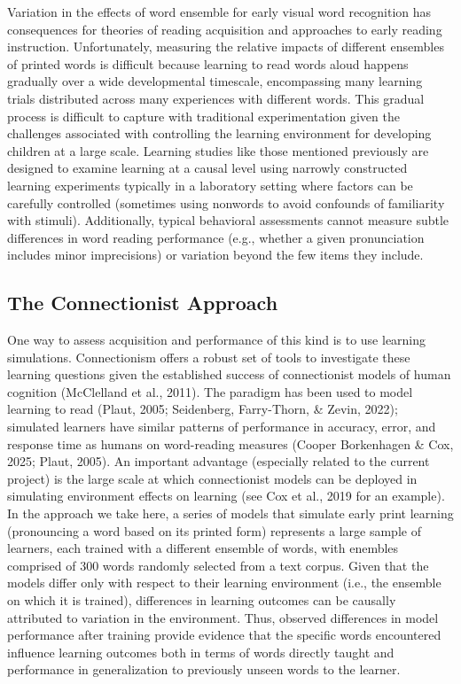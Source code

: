 \documentclass[
  ,man,floatsintext]{apa6}
\begin{document}
Variation in the effects of word ensemble for early visual word recognition has consequences for theories of reading acquisition and approaches to early reading instruction. Unfortunately, measuring the relative impacts of different ensembles of printed words is difficult because learning to read words aloud happens gradually over a wide developmental timescale, encompassing many learning trials distributed across many experiences with different words. This gradual process is difficult to capture with traditional experimentation given the challenges associated with controlling the learning environment for developing children at a large scale. Learning studies like those mentioned previously are designed to examine learning at a causal level using narrowly constructed learning experiments typically in a laboratory setting where factors can be carefully controlled (sometimes using nonwords to avoid confounds of familiarity with stimuli). Additionally, typical behavioral assessments cannot measure subtle differences in word reading performance (e.g., whether a given pronunciation includes minor imprecisions) or variation beyond the few items they include.

\subsection{The Connectionist Approach}\label{the-connectionist-approach}

One way to assess acquisition and performance of this kind is to use learning simulations. Connectionism offers a robust set of tools to investigate these learning questions given the established success of connectionist models of human cognition (McClelland et al., 2011). The paradigm has been used to model learning to read (Plaut, 2005; Seidenberg, Farry-Thorn, \& Zevin, 2022); simulated learners have similar patterns of performance in accuracy, error, and response time as humans on word-reading measures (Cooper Borkenhagen \& Cox, 2025; Plaut, 2005). An important advantage (especially related to the current project) is the large scale at which connectionist models can be deployed in simulating environment effects on learning (see Cox et al., 2019 for an example). In the approach we take here, a series of models that simulate early print learning (pronouncing a word based on its printed form) represents a large sample of learners, each trained with a different ensemble of words, with enembles comprised of 300 words randomly selected from a text corpus. Given that the models differ only with respect to their learning environment (i.e., the ensemble on which it is trained), differences in learning outcomes can be causally attributed to variation in the environment. Thus, observed differences in model performance after training provide evidence that the specific words encountered influence learning outcomes both in terms of words directly taught and performance in generalization to previously unseen words to the learner.
\end{document}
